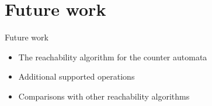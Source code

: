 \documentclass[10pt]{beamer}
\begin{document}
\section{Future work}

\begin{frame}{Future work}
	\begin{itemize}
		\item The reachability algorithm for the counter automata
		\item Additional supported operations
		\item Comparisons with other reachability algorithms 
	\end{itemize}
\end{frame}
\end{document}
